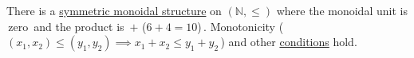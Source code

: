 There is a \hyperref[D2.2]{symmetric monoidal structure} on $(\mathbb{N}, \leq)$ where the monoidal unit is \,zero\, and the product is \,$+$ ($6+4=10$)\,. Monotonicity (\,$(x_1,x_2)\leq(y_1,y_2) \implies x_1+x_2 \leq y_1+y_2$\,) and other \hyperref[D2.2]{conditions} hold.
